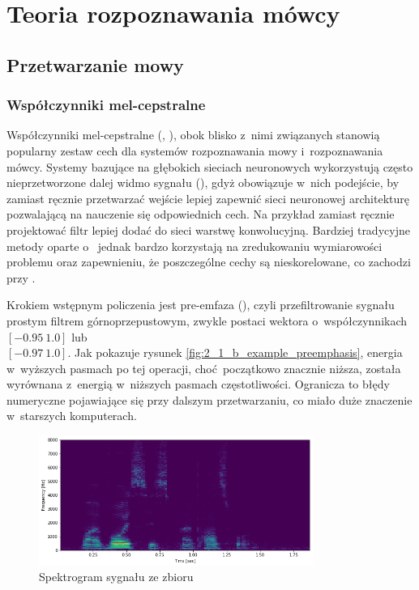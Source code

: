 \chapter{Teoria rozpoznawania mówcy}\label{chap:teoria}

\section{Przetwarzanie mowy}\label{sec:przetwarzanie_mowy}

\subsection{Współczynniki mel-cepstralne}\label{sec:mfcc}

Współczynniki mel-cepstralne (, ),
obok blisko z~nimi związanych  stanowią popularny zestaw
cech dla systemów rozpoznawania mowy i~rozpoznawania mówcy. Systemy bazujące na głębokich sieciach
neuronowych wykorzystują często nieprzetworzone dalej widmo sygnału (), gdyż obowiązuje
w~nich podejście, by zamiast ręcznie przetwarzać wejście lepiej zapewnić sieci neuronowej
architekturę pozwalającą na nauczenie się odpowiednich cech. Na przykład zamiast ręcznie
projektować filtr lepiej dodać do sieci warstwę konwolucyjną. Bardziej tradycyjne metody
oparte o~ jednak bardzo korzystają na zredukowaniu wymiarowości problemu
oraz zapewnieniu, że poszczególne cechy są nieskorelowane, co zachodzi przy .

Krokiem wstępnym policzenia  jest pre-emfaza (), czyli przefiltrowanie sygnału
prostym filtrem górnoprzepustowym, zwykle postaci wektora o~współczynnikach $[-0.95\ 1.0]$ lub \\ $[-0.97\ 1.0]$.
Jak pokazuje rysunek \ref{fig:2_1_b_example_preemphasis}, energia w~wyższych pasmach po tej operacji,
choć początkowo znacznie niższa, została wyrównana z~energią w~niższych pasmach częstotliwości.
Ogranicza to błędy numeryczne
pojawiające się przy dalszym przetwarzaniu, co miało duże znaczenie w~starszych komputerach.

\begin{figure}[H]
    \centering
    \includegraphics[width=0.8\textwidth]{images/2_1_a_example_spectrogram}
    \caption{Spektrogram sygnału  ze zbioru }
    \label{fig:2_1_a_example_spectrogram}
\end{figure}

